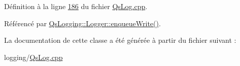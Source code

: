 Définition à la ligne \hyperlink{QsLog_8cpp_source_l00186}{186} du fichier \hyperlink{QsLog_8cpp_source}{Qs\-Log.\-cpp}.



Référencé par \hyperlink{classQsLogging_1_1Logger_acd6d5d16d6e111eaa960807d75549bf9}{Qs\-Logging\-::\-Logger\-::enqueue\-Write()}.



La documentation de cette classe a été générée à partir du fichier suivant \-:\begin{DoxyCompactItemize}
\item 
logging/\hyperlink{QsLog_8cpp}{Qs\-Log.\-cpp}\end{DoxyCompactItemize}
